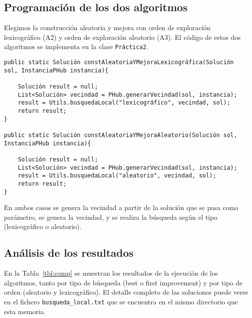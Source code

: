 \documentclass[12pt,a4paper,twoside,openright,titlepage,final]{article}
\begin{document}
\subsection{Programación de los dos algoritmos}

Elegimos la construcción aleatoria y mejora con orden de exploración lexicográfico (A2) y orden de exploración aleatorio (A3). El código de estos dos algoritmos se implementa en la clase \texttt{Práctica2}.

\begin{verbatim}
public static Solución constAleatoriaYMejoraLexicográfica(Solución sol, InstanciaPHub instancia){

    Solución result = null;
    List<Solución> vecindad = PHub.generarVecindad(sol, instancia);
    result = Utils.busquedaLocal("lexicográfico", vecindad, sol);
    return result;
}

public static Solución constAleatoriaYMejoraAleatorio(Solución sol, InstanciaPHub instancia){

    Solución result = null;
    List<Solución> vecindad = PHub.generarVecindad(sol, instancia);
    result = Utils.busquedaLocal("aleatorio", vecindad, sol);
    return result;
}
\end{verbatim}

En ambos casos se genera la vecindad a partir de la solución que se pasa como parámetro, se genera la vecindad, y se realiza la búsqueda según el tipo (lexicográfico o aleatorio).


\subsection{Análisis de los resultados}

En la Tabla~\ref{tbl:comp} se muestran los resultados de la ejecución de los algoritmos, tanto por tipo de búsqueda (best o first improvement) y por tipo de orden (aleatorio y lexicográfico). El detalle completo de las soluciones puede verse en el fichero \texttt{busqueda\_local.txt} que se encuentra en el mismo directorio que esta memoria.\\
\end{document}
